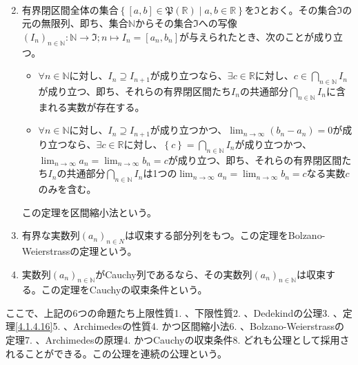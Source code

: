 \documentclass[dvipdfmx]{jsarticle}
\begin{document}
\begin{axs}[連続の公理]
\begin{enumerate}
\begin{itemize}
\begin{align*}
\end{align*}
  \end{itemize}
\item
  有界閉区間全体の集合$\left\{ [ a,b]\in \mathfrak{P}\left( \mathbb{R} \right) \middle| a,b \in \mathbb{R} \right\}$を$\mathfrak{I}$とおく。その集合$\mathfrak{I}$の元の無限列、即ち、集合$\mathbb{N}$からその集合$\mathfrak{I}$への写像$\left( I_{n} \right)_{n \in \mathbb{N}}:\mathbb{N}\mathfrak{\rightarrow I;}n \mapsto I_{n} = \left[ a_{n},b_{n} \right]$が与えられたとき、次のことが成り立つ。
  \begin{itemize}
  \item
    $\forall n \in \mathbb{N}$に対し、$I_{n} \supseteq I_{n + 1}$が成り立つなら、$\exists c \in \mathbb{R}$に対し、$c \in \bigcap_{n \in \mathbb{N}}I_{n}$が成り立つ、即ち、それらの有界閉区間たち$I_{n}$の共通部分$\bigcap_{n \in \mathbb{N}}I_{n}$に含まれる実数が存在する。
  \item
    $\forall n \in \mathbb{N}$に対し、$I_{n} \supseteq I_{n + 1}$が成り立つかつ、$\lim_{n \rightarrow \infty}\left( b_{n} - a_{n} \right) = 0$が成り立つなら、$\exists c \in \mathbb{R}$に対し、$\left\{ c \right\} = \bigcap_{n \in \mathbb{N}}I_{n}$が成り立つかつ、$\lim_{n \rightarrow \infty}a_{n} = \lim_{n \rightarrow \infty}b_{n} = c$が成り立つ、即ち、それらの有界閉区間たち$I_{n}$の共通部分$\bigcap_{n \in \mathbb{N}}I_{n}$は1つの$\lim_{n \rightarrow \infty}a_{n} = \lim_{n \rightarrow \infty}b_{n} = c$なる実数$c$のみを含む。
  \end{itemize}
この定理を区間縮小法という。
\item
  有界な実数列$\left( a_{n} \right)_{n \in N}$は収束する部分列をもつ。この定理をBolzano-Weierstrassの定理という。
\item
  実数列$\left( a_{n} \right)_{n \in \mathbb{N}}$がCauchy列であるなら、その実数列$\left( a_{n} \right)_{n \in \mathbb{N}}$は収束する。この定理をCauchyの収束条件という。
\end{enumerate}
ここで、上記の6つの命題たち上限性質1. 、下限性質2. 、Dedekindの公理3. 、定理\ref{4.1.4.16}5. 、Archimedesの性質4. かつ区間縮小法6. 、Bolzano-Weierstrassの定理7. 、Archimedesの原理4. かつCauchyの収束条件8. どれも公理として採用されることができる。この公理を連続の公理という。
\end{axs}
\end{document}

